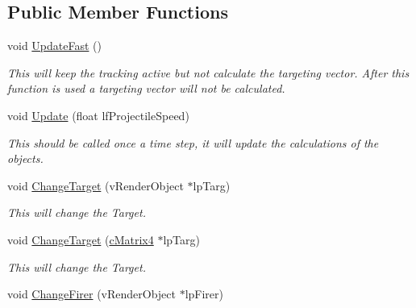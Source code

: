 \subsection*{Public Member Functions}
\begin{DoxyCompactItemize}
\item 
\hypertarget{classc_predictive_tracking_a71b8c07e6575ac7173696bd70fe62b5b}{
void \hyperlink{classc_predictive_tracking_a71b8c07e6575ac7173696bd70fe62b5b}{UpdateFast} ()}
\label{classc_predictive_tracking_a71b8c07e6575ac7173696bd70fe62b5b}

\begin{DoxyCompactList}\small\item\em This will keep the tracking active but not calculate the targeting vector. After this function is used a targeting vector will not be calculated. \end{DoxyCompactList}\item 
\hypertarget{classc_predictive_tracking_ae19205b48dfaacd9c5aefe0e9783cff1}{
void \hyperlink{classc_predictive_tracking_ae19205b48dfaacd9c5aefe0e9783cff1}{Update} (float lfProjectileSpeed)}
\label{classc_predictive_tracking_ae19205b48dfaacd9c5aefe0e9783cff1}

\begin{DoxyCompactList}\small\item\em This should be called once a time step, it will update the calculations of the objects. \end{DoxyCompactList}\item 
\hypertarget{classc_predictive_tracking_aac242467fa6023705514791e54c72b5e}{
void \hyperlink{classc_predictive_tracking_aac242467fa6023705514791e54c72b5e}{ChangeTarget} (vRenderObject $\ast$lpTarg)}
\label{classc_predictive_tracking_aac242467fa6023705514791e54c72b5e}

\begin{DoxyCompactList}\small\item\em This will change the Target. \end{DoxyCompactList}\item 
\hypertarget{classc_predictive_tracking_a4a9466f91c3c371130a0d139df321714}{
void \hyperlink{classc_predictive_tracking_a4a9466f91c3c371130a0d139df321714}{ChangeTarget} (\hyperlink{classc_matrix4}{cMatrix4} $\ast$lpTarg)}
\label{classc_predictive_tracking_a4a9466f91c3c371130a0d139df321714}

\begin{DoxyCompactList}\small\item\em This will change the Target. \end{DoxyCompactList}\item 
\hypertarget{classc_predictive_tracking_a5dd024f056c2f6ac4682736ea83a739f}{
void \hyperlink{classc_predictive_tracking_a5dd024f056c2f6ac4682736ea83a739f}{ChangeFirer} (vRenderObject $\ast$lpFirer)}
\label{classc_predictive_tracking_a5dd024f056c2f6ac4682736ea83a739f}


\end{DoxyCompactItemize}
